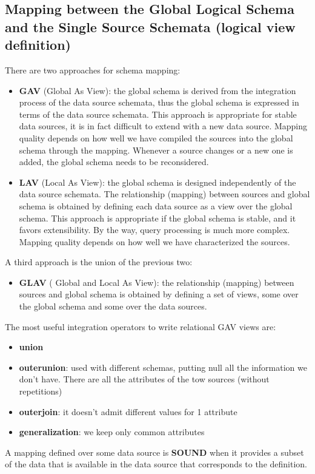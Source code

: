 \documentclass[10pt,a4paper]{article}
\begin{document}
\subsection{Mapping between the Global Logical Schema and the Single Source Schemata (logical view definition)}
There are two approaches for schema mapping:
\begin{itemize}
	\item \textbf{GAV} (Global As View): the global schema is derived from the integration process of the data source schemata, thus the global schema is expressed in terms of the data source schemata. This approach is appropriate for stable data sources, it is in fact difficult to extend with a new data source. Mapping quality depends on how well we have compiled the sources into the global schema through the mapping. Whenever a source changes or a new one is added, the global schema needs to be reconsidered.
	\item \textbf{LAV} (Local As View): the global schema is designed independently of the data source schemata. The relationship (mapping) between sources and global schema is obtained by defining each data source as a view over the global schema. This approach is appropriate if the global schema is stable, and it favors extensibility. By the way, query processing is much more complex. Mapping quality depends on how well we have characterized the sources. 
\end{itemize}
A third approach is the union of the previous two:
\begin{itemize}
	\item \textbf{GLAV} ( Global and Local As View): the relationship (mapping) between sources and global schema is obtained by defining a set of views, some over the global schema and some over the data sources.
\end{itemize}
The most useful integration operators to write relational GAV views are:
\begin{itemize}
	\item \textbf{union}
	\item \textbf{outerunion}: used with different schemas, putting null all the information we don’t have. There are all the attributes of the tow sources (without repetitions)
	\item \textbf{outerjoin}: it doesn’t admit different values for 1 attribute
	\item \textbf{generalization}: we keep only common attributes
\end{itemize}
A mapping defined over some data source is \textbf{SOUND} when it provides a subset of the data that is available in the data source that corresponds to the definition. \\
\end{document}
